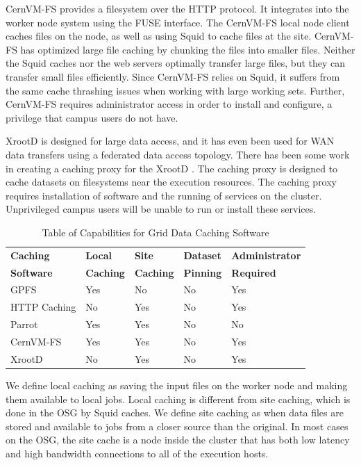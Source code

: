 CernVM-FS \cite{blomer2011cernvm} provides a filesystem over the HTTP protocol.  It integrates into the worker node system using the FUSE \cite{szeredi2010fuse} interface.  The CernVM-FS local node client caches files on the node, as well as using Squid to cache files at the site.  CernVM-FS has optimized large file caching by chunking the files into smaller files.  Neither the Squid caches nor the web servers optimally transfer large files, but they can transfer small files efficiently.  Since CernVM-FS relies on Squid, it suffers from the same cache thrashing issues when working with large working sets.  Further, CernVM-FS requires administrator access in order to install and configure, a privilege that campus users do not have.


XrootD \cite{dorigo2005xrootd} is designed for large data access, and it has even been used for WAN data transfers \cite{bauerdick2012using} using a federated data access topology.  There has been some work in creating a caching proxy for the XrootD \cite{bauerdick2014xrootd}.  The caching proxy is designed to cache datasets on filesystems near the execution resources.  The caching proxy requires installation of software and the running of services on the cluster.  Unprivileged campus users will be unable to run or install these services.

\begin{table}[h!t]
	\centering
	\bgroup
	\def\arraystretch{1.5}
	\begin{tabular}{l | l | l | l | l }
\textbf{Caching} & \textbf{Local} & \textbf{Site}  & \textbf{Dataset } & \textbf{Administrator} \\
\textbf{Software} & \textbf{Caching} & \textbf{Caching} & \textbf{Pinning} & \textbf{Required} \\ \hline
GPFS & Yes & No & No & Yes \\
HTTP Caching & No & Yes & No & Yes \\
Parrot & Yes & Yes & No & No \\
CernVM-FS & Yes & Yes & No & Yes \\
XrootD & No & Yes & No & Yes
	\end{tabular}
	\egroup
	\caption{Table of Capabilities for Grid Data Caching Software}
\end{table}


We define local caching as saving the input files on the worker node and making them available to local jobs.  Local caching is different from site caching, which is done in the OSG by Squid caches.  We define site caching as when data files are stored and available to jobs from a closer source than the original.  In most cases on the OSG, the site cache is a node inside the cluster that has both low latency and high bandwidth connections to all of the execution hosts.

